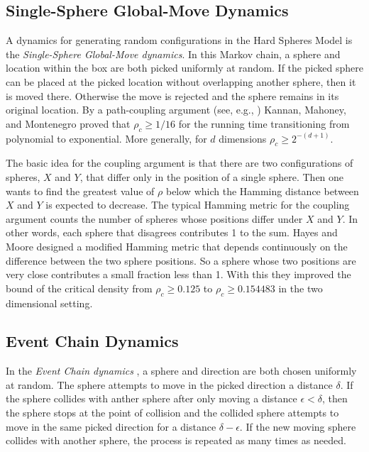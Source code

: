 \documentclass[a4paper,11pt]{article}
\begin{document}
\subsection*{Single-Sphere Global-Move Dynamics}

A dynamics for generating random configurations in the Hard Spheres Model is the \textit{Single-Sphere Global-Move dynamics}.  In this Markov chain, a sphere and location within the box are both picked uniformly at random.  If the picked sphere can be placed at the picked location without overlapping another sphere, then it is moved there.  Otherwise the move is rejected and the sphere remains in its original location.  By a path-coupling argument (see, e.g., \cite{Bubley}) Kannan, Mahoney, and Montenegro \cite{Kannan} proved that $\rho_c \ge 1/16$ for the running time transitioning from polynomial to exponential.  More generally, for $d$ dimensions $\rho_c \ge 2^{-(d + 1)}$.

The basic idea for the coupling argument is that there are two configurations of spheres, $X$ and $Y$, that differ only in the position of a single sphere.  Then one wants to find the greatest value of $\rho$ below which the Hamming distance between $X$ and $Y$ is expected to decrease.  The typical Hamming metric for the coupling argument counts the number of spheres whose positions differ under $X$ and $Y$.  In other words, each sphere that disagrees contributes 1 to the sum.  Hayes and Moore \cite{Hayes} designed a modified Hamming metric that depends continuously on the difference between the two sphere positions.  So a sphere whose two positions are very close contributes a small fraction less than 1.  With this they improved the bound of the critical density from $\rho_c \ge 0.125$ to $\rho_c \ge 0.154483$ in the two dimensional setting.

\subsection*{Event Chain Dynamics}

In the \textit{Event Chain dynamics} \cite{Bernard}, a sphere and direction are both chosen uniformly at random.  The sphere attempts to move in the picked direction a distance $\delta$.  If the sphere collides with anther sphere after only moving a distance $\epsilon < \delta$, then the sphere stops at the point of collision and the collided sphere attempts to move in the same picked direction for a distance $\delta - \epsilon$.  If the new moving sphere collides with another sphere, the process is repeated as many times as needed.
\end{document}
